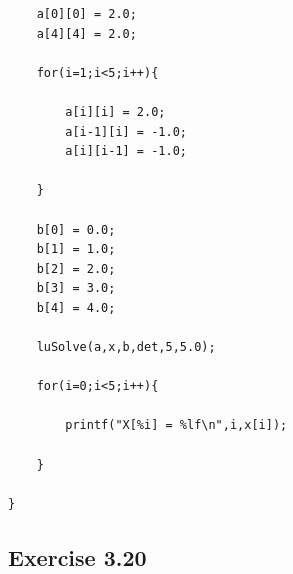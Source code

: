\documentclass[12pt]{article}
\begin{document}
\begin{verbatim}
	a[0][0] = 2.0;
	a[4][4] = 2.0;
	
	for(i=1;i<5;i++){

		a[i][i] = 2.0;
		a[i-1][i] = -1.0;
		a[i][i-1] = -1.0;

	}

	b[0] = 0.0;
	b[1] = 1.0;
	b[2] = 2.0;
	b[3] = 3.0;
	b[4] = 4.0;

	luSolve(a,x,b,det,5,5.0);

	for(i=0;i<5;i++){

		printf("X[%i] = %lf\n",i,x[i]);

	}

}
\end{verbatim}
\subsection{Exercise 3.20}
\end{document}
